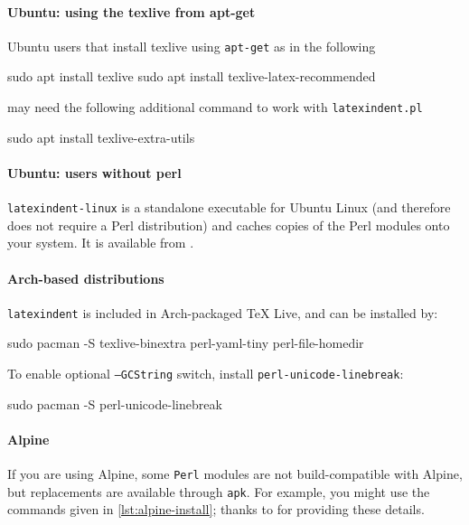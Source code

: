   \paragraph{Ubuntu: using the texlive from apt-get}
   Ubuntu users that install texlive using \texttt{apt-get} as in the following

   \begin{commandshell}
sudo apt install texlive
sudo apt install texlive-latex-recommended
\end{commandshell}

   may need the following additional command to work with \texttt{latexindent.pl}

   \begin{commandshell}
sudo apt install texlive-extra-utils
\end{commandshell}

  \paragraph{Ubuntu: users without perl}

   \texttt{latexindent-linux} is a standalone executable  for Ubuntu Linux (and therefore does not require a Perl distribution)
   and caches copies of the Perl modules onto your system. It is available from \cite{latexindent-home}.
     

  \paragraph{Arch-based distributions}
   \texttt{latexindent} is included in Arch-packaged TeX Live, and can be installed by:

   \begin{commandshell}
sudo pacman -S texlive-binextra perl-yaml-tiny perl-file-homedir
\end{commandshell}

   To enable optional \texttt{--GCString} switch, install
   \texttt{perl-unicode-linebreak}:

   \begin{commandshell}
sudo pacman -S perl-unicode-linebreak
\end{commandshell}

  \paragraph{Alpine}
   If you are using Alpine, some \texttt{Perl} modules are not build-compatible with
   Alpine, but replacements are available through \texttt{apk}. For example, you might
   use the commands given in \cref{lst:alpine-install}; thanks to \cite{jun-sheaf} for
   providing these details.

